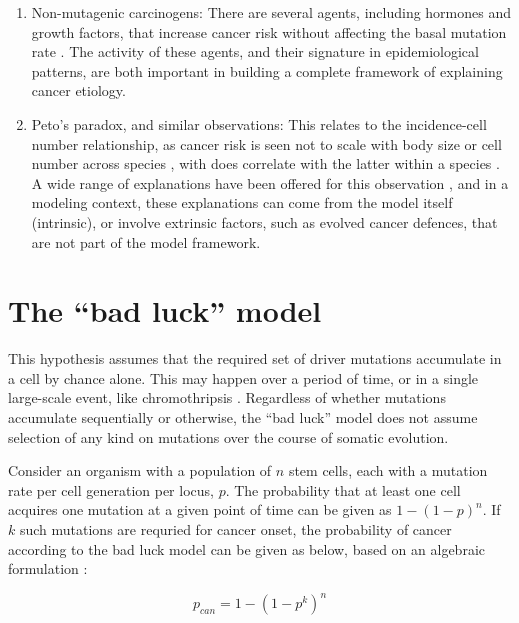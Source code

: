 \documentclass[10pt,twocolumn,twoside]{article}
\begin{document}
\begin{enumerate}
	\item Non-mutagenic carcinogens: There are several agents, including hormones and growth factors, that increase cancer risk without affecting the basal mutation rate \cite{Tennant1993}. The activity of these agents, and their signature in epidemiological patterns, are both important in building a complete framework of explaining cancer etiology.
	\item Peto's paradox, and similar observations: This relates to the incidence-cell number relationship, as cancer risk is seen not to scale with body size or cell number across species \cite{Nagy2007}, with does correlate with the latter within a species \cite{Noble2015}. A wide range of explanations have been offered for this observation \cite{Tollis2017b}, and in a modeling context, these explanations can come from the model itself (intrinsic), or involve extrinsic factors, such as evolved cancer defences, that are not part of the model framework.
\end{enumerate}


\section{The ``bad luck'' model}

This hypothesis assumes that the required set of driver mutations accumulate in a cell by chance alone. This may happen over a period of time, or in a single large-scale event, like chromothripsis \cite{Stephens2011}. Regardless of whether mutations accumulate sequentially or otherwise, the ``bad luck'' model does not assume selection of any kind on mutations over the course of somatic evolution.

Consider an organism with a population of $n$ stem cells, each with a mutation rate per cell generation per locus, $p$. The probability that at least one cell acquires one mutation at a given point of time can be given as $1-(1-p)^{n}$. If $k$ such mutations are requried for cancer onset, the probability of cancer according to the bad luck model can be given as below, based on an algebraic formulation \cite{Calabrese2010}:

\begin{equation}
	\label{E1}
	p_{can} = 1-(1-p^{k})^{n}
\end{equation}
\end{document}

